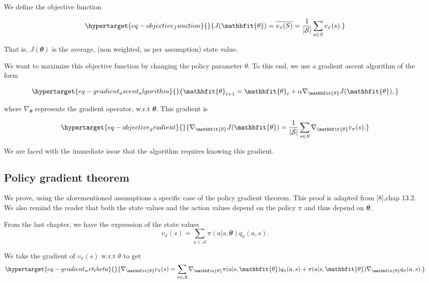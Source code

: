 \documentclass[
  letterpaper,
]{report}
\theoremstyle{plain}
\theoremstyle{definition}
\theoremstyle{definition}
\theoremstyle{remark}
\begin{document}
We define the objective function

\begin{equation}\protect\hypertarget{eq-objective_function}{}{
J(\mathbfit{\theta}) = \overline{v_\pi(S)} = \frac{1}{|\mathcal{S}|}\sum_{s\in S}v_\pi(s).
}\label{eq-objective_function}\end{equation}

That is, \(J(\mathbfit{\theta})\) is the average, (non weighted, as per
assumption) state value.

We want to maximize this objective function by changing the policy
parameter \(\theta\). To this end, we use a gradient ascent algorithm of
the form

\begin{equation}\protect\hypertarget{eq-gradient_ascent_algorithm}{}{
\mathbfit{\theta}_{t+1} = {\mathbfit{\theta}}_t + \alpha \nabla_{\mathbfit{\theta}} J(\mathbfit{\theta}),
}\label{eq-gradient_ascent_algorithm}\end{equation}

where \(\nabla_{\mathbfit{\theta}}\) represents the gradient operator,
w.r.t \(\mathbfit{\theta}\). This gradient is

\begin{equation}\protect\hypertarget{eq-objective_gradient}{}{
\nabla_{\mathbfit{\theta}} J(\mathbfit{\theta}) = \frac{1}{|\mathcal{S}|}\sum_{s\in S}\nabla_{\mathbfit{\theta}}v_\pi(s).
}\label{eq-objective_gradient}\end{equation}

We are faced with the immediate issue that the algorithm requires
knowing this gradient.

\hypertarget{policy-gradient-theorem}{%
\subsection{Policy gradient theorem}\label{policy-gradient-theorem}}

We prove, using the aforementioned assumptions a specific case of the
policy gradient theorem. This proof is adapted from {[}8{]},chap 13.2.
We also remind the reader that both the state values and the action
values depend on the policy \(\pi\) and thus depend on
\(\mathbfit{\theta}\).

From the last chapter, we have the expression of the state values \[
v_\pi(s) = \sum_{a\in\mathcal{A}}\pi(a|s, \mathbfit{\theta})q_\pi(a,s).
\]

We take the gradient of \(v_\pi(s)\) w.r.t \(\theta\) to get
\begin{equation}\protect\hypertarget{eq-gradient_wrt_theta}{}{
\nabla_{\mathbfit{\theta}} v_\pi(s) = \sum_{a\in\mathcal{A}}\nabla_{\mathbfit{\theta}}\pi(a|s, {\mathbfit{\theta}})q_\pi(a,s) + \pi(a|s,{\mathbfit{\theta}})\nabla_{\mathbfit{\theta}} q_\pi(a,s).
}\label{eq-gradient_wrt_theta}\end{equation}
\end{document}
